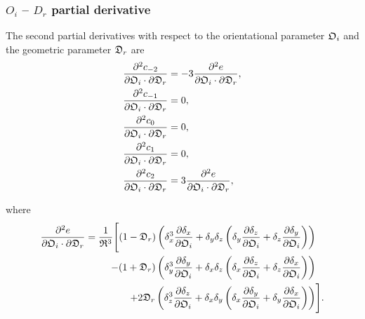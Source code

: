 \begin{latexonly}
    \subsubsection{$O_i$ -- $D_r$ partial derivative}
\end{latexonly}
\begin{htmlonly}
\end{htmlonly}

The second partial derivatives with respect to the orientational parameter $\mathfrak{O}_i$ and the geometric parameter $\mathfrak{D}_r$ are
\begin{subequations}
\begin{align}
    \frac{\partial^2 c_{-2}}{\partial \mathfrak{O}_i \cdot \partial \mathfrak{D}_r}  &=  -3 \frac{\partial^2 e}{\partial \mathfrak{O}_i \cdot \partial \mathfrak{D}_r}, \\
    \frac{\partial^2 c_{-1}}{\partial \mathfrak{O}_i \cdot \partial \mathfrak{D}_r} &= 0, \\
    \frac{\partial^2 c_{0}}{\partial \mathfrak{O}_i \cdot \partial \mathfrak{D}_r}  &= 0, \\
    \frac{\partial^2 c_{1}}{\partial \mathfrak{O}_i \cdot \partial \mathfrak{D}_r}  &= 0, \\
    \frac{\partial^2 c_{2}}{\partial \mathfrak{O}_i \cdot \partial \mathfrak{D}_r}  &= 3 \frac{\partial^2 e}{\partial \mathfrak{O}_i \cdot \partial \mathfrak{D}_r},
\end{align}
\end{subequations}

\noindent where
\begin{align}
    \frac{\partial^2 e}{\partial \mathfrak{O}_i \cdot \partial \mathfrak{D}_r}  =  \frac{1}{\mathfrak{R}^3} \Bigg[
        (1 - \mathfrak{D}_r) \left(
            \delta_x^3 \frac{\partial \delta_x}{\partial \mathfrak{O}_i}
            +  \delta_y \delta_z \left( \delta_y \frac{\partial \delta_z}{\partial \mathfrak{O}_i}  +  \delta_z \frac{\partial \delta_y}{\partial \mathfrak{O}_i} \right) \right) & \nonumber \\
        -  (1 + \mathfrak{D}_r) \left(
            \delta_y^3 \frac{\partial \delta_y}{\partial \mathfrak{O}_i}
            +  \delta_x \delta_z \left( \delta_x \frac{\partial \delta_z}{\partial \mathfrak{O}_i}  +  \delta_z \frac{\partial \delta_x}{\partial \mathfrak{O}_i} \right) \right) & \nonumber \\
        +  2 \mathfrak{D}_r \left(
            \delta_z^3 \frac{\partial \delta_z}{\partial \mathfrak{O}_i}
            +  \delta_x \delta_y \left( \delta_x \frac{\partial \delta_y}{\partial \mathfrak{O}_i}  +  \delta_y \frac{\partial \delta_x}{\partial \mathfrak{O}_i} \right) \right) &
    \Bigg].
\end{align}



